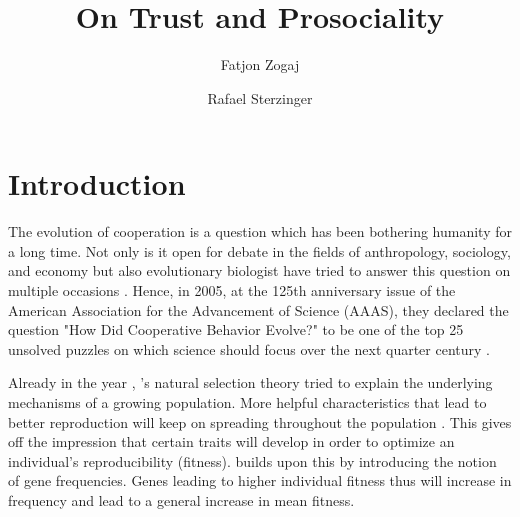 \documentclass[sigconf]{acmart}
\newcommand{\todo}[1]{{\color{red}{#1}}}
\begin{document}
    \title{On Trust and Prosociality}

    \author{Fatjon Zogaj}\affiliation{}

    \author{Rafael Sterzinger}\affiliation{}

    \begin{abstract}
    \end{abstract}

    \maketitle


    \section{Introduction}\label{sec:introduction}


    The evolution of cooperation is a question which has been bothering humanity for a long time.
    Not only is it open for debate in the fields of anthropology, sociology, and economy but also evolutionary biologist have tried to answer this question on multiple occasions \cite{gardner_theory_2009}.
    Hence, in 2005, at the 125th anniversary issue of the American Association for the Advancement of Science (AAAS), they declared the question "How Did Cooperative Behavior Evolve?" to be one of the top 25 unsolved puzzles on which science should focus over the next quarter century \cite{aaas_125th_2005}.

    Already in the year \citeyear{darwin_origin_1859}, \citeauthor{darwin_origin_1859}'s natural selection theory tried to explain the underlying mechanisms of a growing population.
    More helpful characteristics that lead to better reproduction will keep on spreading throughout the population \cite{darwin_origin_1859}.
    This gives off the impression that certain traits will develop in order to optimize an individual's reproducibility (fitness). \citeauthor{fisherGeneticalTheoryNatural1930} \cite{fisherGeneticalTheoryNatural1930} builds upon this by introducing the notion of gene frequencies.
    Genes leading to higher individual fitness thus will increase in frequency and lead to a general increase in mean fitness.
\end{document}
